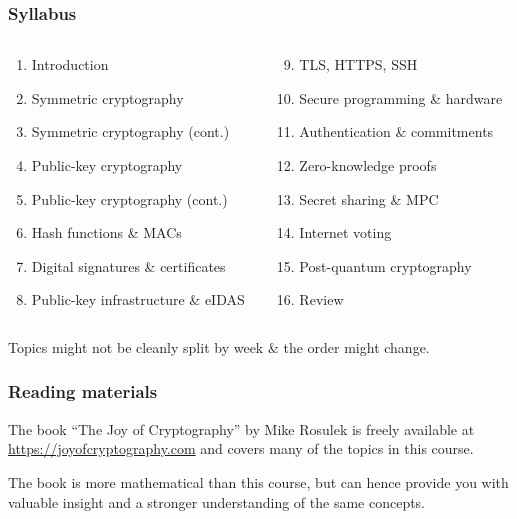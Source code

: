 \begin{frame}
  \frametitle{Syllabus}

  \begin{columns}[t]
    \begin{column}{.5\textwidth}
      \begin{enumerate}
        \item Introduction
        \item Symmetric cryptography
        \item Symmetric cryptography (cont.)
        \item Public-key cryptography
        \item Public-key cryptography (cont.)
        \item Hash functions \& MACs
        \item Digital signatures \& certificates
        \item Public-key infrastructure \& eIDAS
      \end{enumerate}
    \end{column}

    \begin{column}{.5\textwidth}
      \begin{enumerate}\setcounter{enumi}{8}
        \item TLS, HTTPS, SSH
        \item Secure programming \& hardware
        \item Authentication \& commitments
        \item Zero-knowledge proofs
        \item Secret sharing \& MPC
        \item Internet voting
        \item Post-quantum cryptography
        \item Review
      \end{enumerate}
    \end{column}
  \end{columns}

  \vspace*{2em}

  \pause
  Topics might not be cleanly split by week \& the order might change.
\end{frame}

\begin{frame}
  \frametitle{Reading materials}

  The book \enquote{The Joy of Cryptography} by Mike Rosulek is freely available at \url{https://joyofcryptography.com} and covers many of the topics in this course.

  \vspace*{1em}

  The book is more mathematical than this course, but can hence provide you with valuable insight and a stronger understanding of the same concepts. 
\end{frame}



